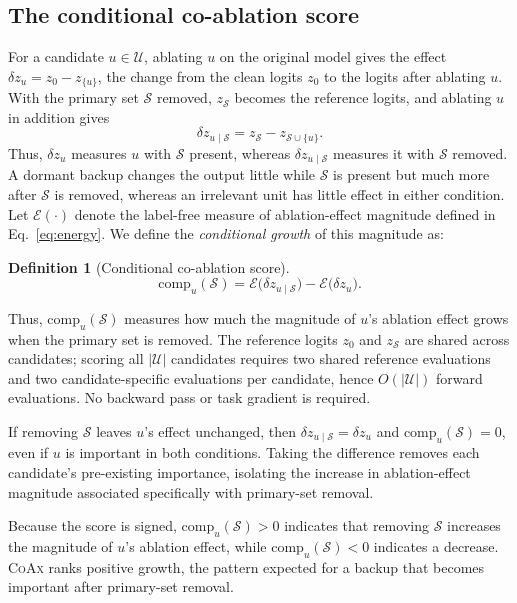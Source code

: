 \documentclass{article} %
\theoremstyle{plain}
\theoremstyle{definition}
\newtheorem{definition}{Definition}
\newcommand{\coax}{\textsc{CoAx}\xspace}
\newcommand{\comp}{\mathrm{comp}}
\newcommand{\energy}{\mathcal{E}}
\newcommand{\dz}{\delta z}
\newcommand{\Sset}{\mathcal{S}}
\newcommand{\Uset}{\mathcal{U}}
\newcommand{\backup}[1]{\textcolor{backupcolor}{#1}}
\newcommand{\irrelevant}[1]{\textcolor{irrelevantcolor}{#1}}
\begin{document}
\subsection{The conditional co-ablation score}
\label{sec:score}

For a candidate $u\in\Uset$, ablating $u$ on the original model gives the effect
$\dz_u=z_0-z_{\{u\}}$, the change from the clean logits $z_0$ to the logits after ablating $u$.
With the primary set $\Sset$ removed, $z_\Sset$ becomes the reference logits, and ablating $u$ in addition gives
\begin{equation}
\dz_{u\mid\Sset}
=
z_\Sset-z_{\Sset\cup\{u\}} .
\label{eq:condeff}
\end{equation}
Thus, $\dz_u$ measures $u$ with $\Sset$ present, whereas
$\dz_{u\mid\Sset}$ measures it with $\Sset$ removed.
A dormant \backup{backup} changes the output little while $\Sset$ is present but much more after $\Sset$ is removed, whereas an \irrelevant{irrelevant} unit has little effect in either condition.
Let $\energy(\cdot)$ denote the label-free measure of ablation-effect magnitude defined in Eq.~\ref{eq:energy}.
We define the \emph{conditional growth} of this magnitude as:

\begin{definition}[Conditional co-ablation score]
\label{def:coax}
\begin{equation}
\comp_u(\Sset)
=
\energy\!\big(\dz_{u\mid\Sset}\big)
-
\energy\!\big(\dz_u\big).
\label{eq:comp}
\end{equation}
\end{definition}

\noindent Thus, $\comp_u(\Sset)$ measures how much the magnitude of $u$'s ablation effect grows when the primary set is removed.
The reference logits $z_0$ and $z_\Sset$ are shared across candidates; scoring all $|\Uset|$ candidates requires two shared reference evaluations and two candidate-specific evaluations per candidate, hence $O(|\Uset|)$ forward evaluations.
No backward pass or task gradient is required.

If removing $\Sset$ leaves $u$'s effect unchanged, then
$\dz_{u\mid\Sset}=\dz_u$ and $\comp_u(\Sset)=0$, even if $u$ is important in both conditions.
Taking the difference removes each candidate's pre-existing importance, isolating the increase in ablation-effect magnitude associated specifically with primary-set removal.

Because the score is signed, $\comp_u(\Sset)>0$ indicates that removing $\Sset$ increases the magnitude of $u$'s ablation effect, while $\comp_u(\Sset)<0$ indicates a decrease.
\coax ranks positive growth, the pattern expected for a backup that becomes important after primary-set removal.
\end{document}

